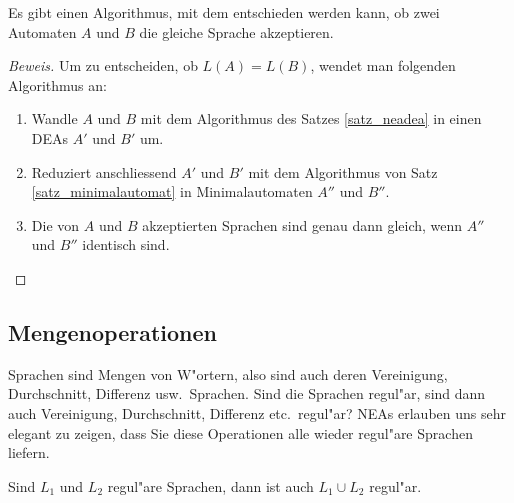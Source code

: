 \begin{satz}
Es gibt einen Algorithmus, mit dem entschieden werden kann, ob
zwei Automaten $A$ und $B$ die gleiche Sprache akzeptieren.
\end{satz}

\begin{proof}[Beweis]
Um zu entscheiden, ob $L(A)=L(B)$, wendet man folgenden Algorithmus
an:
\begin{enumerate}
\item Wandle $A$ und $B$
mit dem Algorithmus des Satzes 
\ref{satz_neadea} in einen DEAs $A'$ und $B'$ um.
\item Reduziert anschliessend $A'$ und $B'$  mit dem Algorithmus
von Satz \ref{satz_minimalautomat} in Minimalautomaten
$A''$ und $B''$.
\item Die von $A$ und $B$ akzeptierten Sprachen sind genau dann
gleich, wenn $A''$ und $B''$ identisch sind.
\end{enumerate}
\end{proof}

\subsection{Mengenoperationen}
Sprachen sind Mengen von W"ortern, also sind auch deren Vereinigung,
Durchschnitt, Differenz usw.~Sprachen. Sind die Sprachen regul"ar,
sind dann auch Vereinigung, Durchschnitt, Differenz etc.~regul"ar? 
NEAs erlauben uns sehr elegant zu zeigen, dass Sie diese Operationen
alle wieder regul"are Sprachen liefern.

\begin{satz}
\label{satz_union}
Sind $L_1$ und $L_2$ regul"are Sprachen, dann
ist auch $L_1\cup L_2$ regul"ar.
\end{satz}

